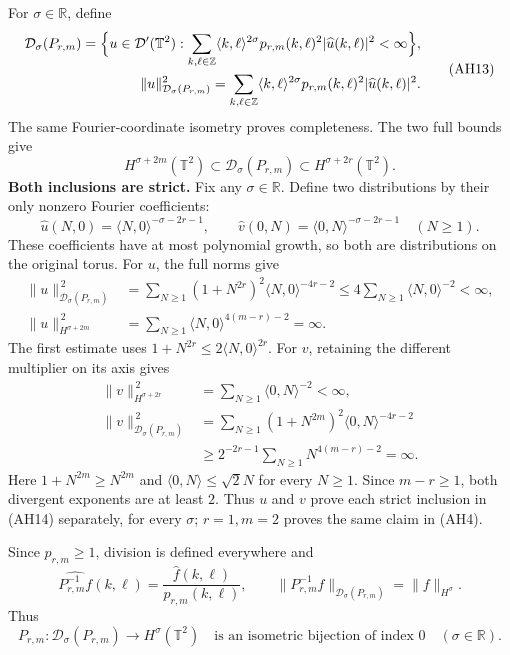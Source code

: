 \documentclass[
  11pt,
]{article}
\begin{document}
For \(\sigma\in\mathbb R\), define \[
 \begin{aligned}
 \mathcal D_\sigma(P_{r,m})
 =\Bigl\{u\in\mathcal D'(\mathbb T^2):
   \sum_{k,\ell\in\mathbb Z}
   \langle k,\ell\rangle^{2\sigma}
   p_{r,m}(k,\ell)^2|\widehat u(k,\ell)|^2<\infty\Bigr\},\\
 \|u\|_{\mathcal D_\sigma(P_{r,m})}^2
 =\sum_{k,\ell\in\mathbb Z}
   \langle k,\ell\rangle^{2\sigma}
   p_{r,m}(k,\ell)^2|\widehat u(k,\ell)|^2 .
 \end{aligned}
 \tag{AH13}
\] The same Fourier-coordinate isometry proves completeness. The two
full bounds give \[
 H^{\sigma+2m}(\mathbb T^2)
 \subset\mathcal D_\sigma(P_{r,m})
 \subset H^{\sigma+2r}(\mathbb T^2).
 \tag{AH14}
\] \textbf{Both inclusions are strict.} Fix any \(\sigma\in\mathbb R\).
Define two distributions by their only nonzero Fourier coefficients: \[
 \widehat u(N,0)=\langle N,0\rangle^{-\sigma-2r-1},
 \qquad
 \widehat v(0,N)=\langle0,N\rangle^{-\sigma-2r-1}
 \quad(N\geq1).
 \tag{AH22}
\] These coefficients have at most polynomial growth, so both are
distributions on the original torus. For \(u\), the full norms give \[
 \begin{aligned}
 \|u\|_{\mathcal D_\sigma(P_{r,m})}^{\,2}
 &=\sum_{N\geq1}(1+N^{2r})^2
             \langle N,0\rangle^{-4r-2}
 \leq4\sum_{N\geq1}\langle N,0\rangle^{-2}<\infty,\\
 \|u\|_{H^{\sigma+2m}}^{\,2}
 &=\sum_{N\geq1}\langle N,0\rangle^{4(m-r)-2}=\infty.
 \end{aligned}
 \tag{AH23}
\] The first estimate uses \(1+N^{2r}\leq2\langle N,0\rangle^{2r}\). For
\(v\), retaining the different multiplier on its axis gives \[
 \begin{aligned}
 \|v\|_{H^{\sigma+2r}}^{\,2}
 &=\sum_{N\geq1}\langle0,N\rangle^{-2}<\infty,\\
 \|v\|_{\mathcal D_\sigma(P_{r,m})}^{\,2}
 &=\sum_{N\geq1}(1+N^{2m})^2
                   \langle0,N\rangle^{-4r-2}\\
 &\geq 2^{-2r-1}\sum_{N\geq1}N^{4(m-r)-2}=\infty.
 \end{aligned}
 \tag{AH24}
\] Here \(1+N^{2m}\geq N^{2m}\) and \(\langle0,N\rangle\leq\sqrt2N\) for
every \(N\geq1\). Since \(m-r\geq1\), both divergent exponents are at
least \(2\). Thus \(u\) and \(v\) prove each strict inclusion in (AH14)
separately, for every \(\sigma\); \(r=1,m=2\) proves the same claim in
(AH4).

Since \(p_{r,m}\geq1\), division is defined everywhere and \[
 \widehat{P_{r,m}^{-1}f}(k,\ell)
 =\frac{\widehat f(k,\ell)}{p_{r,m}(k,\ell)},\qquad
 \|P_{r,m}^{-1}f\|_{\mathcal D_\sigma(P_{r,m})}
 =\|f\|_{H^\sigma}.
 \tag{AH15}
\] Thus \[
 P_{r,m}:\mathcal D_\sigma(P_{r,m})
 \longrightarrow H^\sigma(\mathbb T^2)
 \quad\text{is an isometric bijection of index \(0\)}
 \quad(\sigma\in\mathbb R).
 \tag{AH16}
\]
\end{document}
